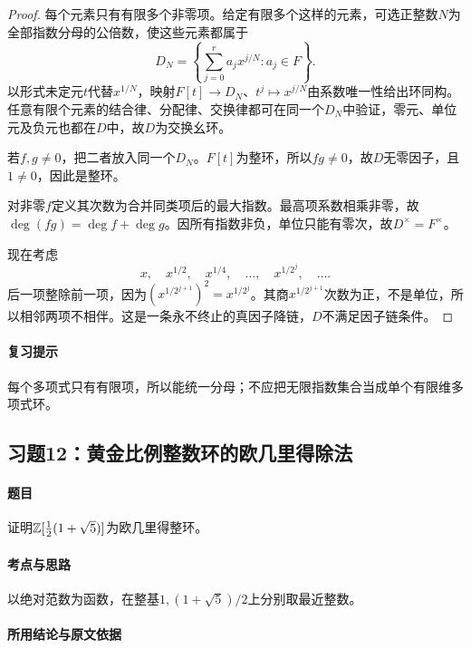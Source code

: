 \begin{proof}

每个元素只有有限多个非零项。给定有限多个这样的元素，可选正整数$N$为全部指数分母的公倍数，使这些元素都属于
\[
D_N=\left\{\sum_{j=0}^r a_jx^{j/N}:a_j\in F\right\}.
\]
以形式未定元$t$代替$x^{1/N}$，映射$F[t]\to D_N$、$t^j\mapsto x^{j/N}$由系数唯一性给出环同构。任意有限个元素的结合律、分配律、交换律都可在同一个$D_N$中验证，零元、单位元及负元也都在$D$中，故$D$为交换幺环。

若$f,g\ne0$，把二者放入同一个$D_N$。$F[t]$为整环，所以$fg\ne0$，故$D$无零因子，且$1\ne0$，因此是整环。

对非零$f$定义其次数为合并同类项后的最大指数。最高项系数相乘非零，故$\deg(fg)=\deg f+\deg g$。因所有指数非负，单位只能有零次，故$D^\times=F^\times$。

现在考虑
\[
x,\quad x^{1/2},\quad x^{1/4},\quad\ldots,\quad x^{1/2^j},\quad\ldots.
\]
后一项整除前一项，因为$(x^{1/2^{j+1}})^2=x^{1/2^j}$。其商$x^{1/2^{j+1}}$次数为正，不是单位，所以相邻两项不相伴。这是一条永不终止的真因子降链，$D$不满足因子链条件。

\end{proof}

\paragraph{复习提示}

每个多项式只有有限项，所以能统一分母；不应把无限指数集合当成单个有限维多项式环。

\subsection{习题12：黄金比例整数环的欧几里得除法}

\label{ex:4:12}

\paragraph{题目}

证明$\mathbb Z[\tfrac12(1+\sqrt5)]$为欧几里得整环。

\paragraph{考点与思路}

以绝对范数为函数，在整基$1,(1+\sqrt5)/2$上分别取最近整数。

\paragraph{所用结论与原文依据}

